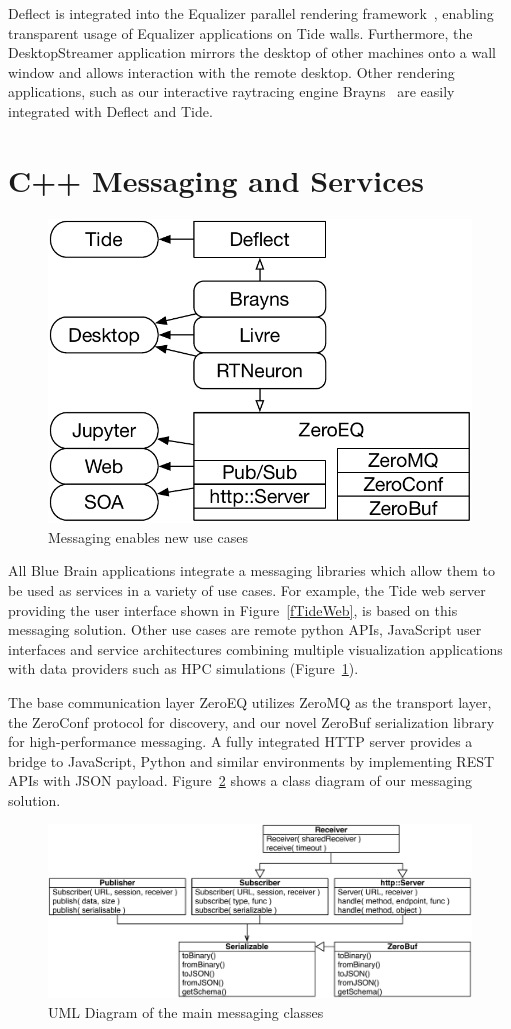\documentclass[10pt]{llncs}
\newcommand{\fig}[1]{Figure~\ref{#1}}
\begin{document}
Deflect is integrated into the Equalizer parallel rendering
framework~\cite{EMP:09}, enabling transparent usage of Equalizer applications on
Tide walls. Furthermore, the DesktopStreamer application mirrors the desktop of
other machines onto a wall window and allows interaction with the remote
desktop. Other rendering applications, such as our interactive raytracing
engine Brayns~\cite{brayns} are easily integrated with Deflect and Tide.

\section{C++ Messaging and Services}

\begin{figure}\center\vspace{-6ex}
  \includegraphics[width=.382\textwidth]{images/ZeroMS}
  {\caption{\label{fZero}Messaging enables new use cases}}\vspace{-2ex}
\end{figure}

All Blue Brain applications integrate a messaging libraries which allow them
to be used as services in a variety of use cases. For example, the Tide web
server providing the user interface shown in \fig{fTideWeb}, is based on this
messaging solution. Other use cases are remote python APIs, JavaScript user
interfaces and service architectures combining multiple visualization
applications with data providers such as HPC simulations (\fig{fZero}).

The base communication layer ZeroEQ utilizes ZeroMQ as the transport layer, the
ZeroConf protocol for discovery, and our novel ZeroBuf serialization library for
high-performance messaging. A fully integrated HTTP server provides a bridge to
JavaScript, Python and similar environments by implementing REST APIs with JSON
payload. \fig{fUML} shows a class diagram of our messaging solution.

\begin{figure}[ht]\center
  \includegraphics[width=\columnwidth]{images/ZeroMSUML}
  \caption{\label{fUML}UML Diagram of the main messaging classes}
\end{figure}
\end{document}
